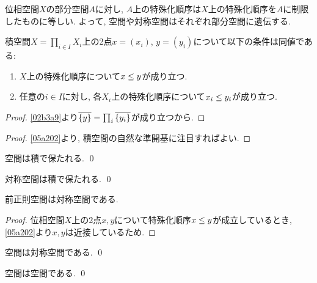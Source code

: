 \documentclass[uplatex, dvipdfmx, a4paper, 12pt, class=jsbook, crop=false]{standalone}
\begin{document}
位相空間$X$の部分空間$A$に対し, $A$上の特殊化順序は$X$上の特殊化順序を$A$に制限したものに等しい.
よって, 空間や対称空間はそれぞれ部分空間に遺伝する.

\begin{proposition}
	\label{a1a202}
	積空間$X = \prod_{i \in I} X_i$上の2点$x = (x_i)$, $y = (y_i)$について以下の条件は同値である:
	\begin{enumerate}
		\item $X$上の特殊化順序について$x \leq y$が成り立つ.
		\item 任意の$i \in I$に対し, 各$X_i$上の特殊化順序について$x_i \leq y_i$が成り立つ.
	\end{enumerate}
\end{proposition}

\begin{proof}
	\cref{02b3a9}より$\overline{\{y\}} = \prod_i \overline{\{y_i\}}$が成り立つから.
\end{proof}

\begin{proof}
	\cref{05a202}より, 積空間の自然な準開基に注目すればよい.
\end{proof}

\begin{corollary}
	空間は積で保たれる.
	\qed
\end{corollary}

\begin{corollary}
	対称空間は積で保たれる.
	\qed
\end{corollary}

\begin{proposition}
	前正則空間は対称空間である.
\end{proposition}

\begin{proof}
	位相空間\(X\)上の2点\(x ,y\)について特殊化順序\(x \leq y\)が成立しているとき,
	\cref{05a202}より\(x, y\)は近接しているため.
\end{proof}

\begin{proposition}
	空間は対称空間である.
	\qed
\end{proposition}

\begin{proposition}
	空間は空間である.
	\qed
\end{proposition}
\end{document}
